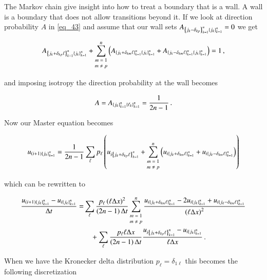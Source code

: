 \documentclass[11pt,english,a4paper]{article}
\begin{document}
\begin{flushleft}
The Markov chain give insight into how to treat a boundary that is a wall. A wall is a boundary that does not allow transitions beyond it. If we look at direction probability $A$ in \eqref{eq_43} and assume that our wall sets $A_{\left\lbrace{j_k-\delta_{kp}}\right\rbrace_{k=1}^n\left\lbrace{j_k}\right\rbrace_{k=1}^n}=0$ we get

\begin{align*}
A_{\left\lbrace{j_k+\delta_{kp}\ell}\right\rbrace_{k=1}^n\left\lbrace{j_k}\right\rbrace_{k=1}^n} + \sum_{\scriptsize\begin{matrix}m=1\\ m\neq p\end{matrix}}^n \left({A_{\left\lbrace{j_k+\delta_{km}\ell}\right\rbrace_{k=1}^n\left\lbrace{j_k}\right\rbrace_{k=1}^n}+A_{\left\lbrace{j_k-\delta_{km}\ell}\right\rbrace_{k=1}^n\left\lbrace{j_k}\right\rbrace_{k=1}^n}}\right) = 1 \,,
\end{align*}

and imposing isotropy the direction probability at the wall becomes

\begin{align*}
A = A_{\left\lbrace{j_k}\right\rbrace_{k=1}^n\left\lbrace{\ell_k}\right\rbrace_{k=1}^n} = \frac{1}{2n-1} \,.
\end{align*}

Now our Master equation becomes

\begin{align*}
u_{(i+1)\left\lbrace{j_k}\right\rbrace_{k=1}^n} = \frac{1}{2n-1}\sum_\ell p_\ell \left({u_{i\left\lbrace{j_k+\delta_{kp}\ell}\right\rbrace_{k=1}^n}+\sum_{\scriptsize\begin{matrix}m=1\\ m\neq p\end{matrix}}^n \left({u_{i\left\lbrace{j_k+\delta_{km}\ell}\right\rbrace_{k=1}^n} + u_{i\left\lbrace{j_k-\delta_{km}\ell}\right\rbrace_{k=1}^n}}\right)}\right)
\end{align*}

which can be rewritten to 

\begin{align*}
\frac{u_{(i+1)\left\lbrace{j_k}\right\rbrace_{k=1}^n}-u_{i\left\lbrace{j_k}\right\rbrace_{k=1}^n}}{\Delta t} =& \sum_{\ell}\frac{p_\ell \left({\ell \Delta x}\right)^2}{\left({2n-1}\right)\Delta t}\sum_{\scriptsize\begin{matrix}m=1\\ m\neq p\end{matrix}}^n\frac{u_{i\left\lbrace{j_k+\delta_{km}\ell}\right\rbrace_{k=1}^n} - 2 u_{i\left\lbrace{j_k}\right\rbrace_{k=1}^n} + u_{i\left\lbrace{j_k-\delta_{km}\ell}\right\rbrace_{k=1}^n}}{\left({\ell\Delta x}\right)^2} 
\\
&\quad +\sum_{\ell}\frac{p_\ell\ell \Delta x}{\left({2n-1}\right)\Delta t} \frac{u_{i\left\lbrace{j_k+\delta_{kp}\ell}\right\rbrace_{k=1}^n} - u_{i\left\lbrace{j_k}\right\rbrace_{k=1}^n}}{\ell\Delta x} \,.
\end{align*}

When we have the Kronecker delta distribution $p_\ell = \delta_{1\ell}$ this becomes the following discretization


\end{flushleft}
\end{document}
